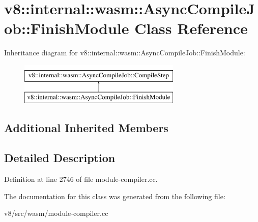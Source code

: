 \hypertarget{classv8_1_1internal_1_1wasm_1_1AsyncCompileJob_1_1FinishModule}{}\section{v8\+:\+:internal\+:\+:wasm\+:\+:Async\+Compile\+Job\+:\+:Finish\+Module Class Reference}
\label{classv8_1_1internal_1_1wasm_1_1AsyncCompileJob_1_1FinishModule}
Inheritance diagram for v8\+:\+:internal\+:\+:wasm\+:\+:Async\+Compile\+Job\+:\+:Finish\+Module\+:\begin{figure}[H]
\begin{center}
\leavevmode
\includegraphics[height=2.000000cm]{classv8_1_1internal_1_1wasm_1_1AsyncCompileJob_1_1FinishModule}
\end{center}
\end{figure}
\subsection*{Additional Inherited Members}


\subsection{Detailed Description}


Definition at line 2746 of file module-\/compiler.\+cc.



The documentation for this class was generated from the following file\+:\begin{DoxyCompactItemize}
\item 
v8/src/wasm/module-\/compiler.\+cc\end{DoxyCompactItemize}
